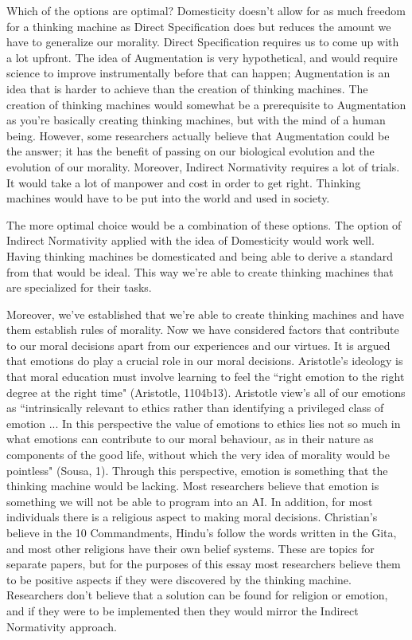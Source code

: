 \documentclass[11pt, oneside]{article}
\begin{document}
\par Which of the options are optimal? Domesticity doesn't allow for as much freedom for a thinking machine as Direct Specification does but reduces the amount we have to generalize our morality. Direct Specification requires us to come up with a lot upfront.
The idea of Augmentation is very hypothetical, and would require science to improve instrumentally before that can happen; Augmentation is an idea that is harder to achieve than the creation of thinking machines. The creation of thinking machines would somewhat be a prerequisite to Augmentation as you're basically creating thinking machines, but with the mind of a human being. However, some researchers actually believe that Augmentation could be the answer; it has the benefit of passing on our biological evolution and the evolution of our morality. Moreover, Indirect Normativity requires a lot of trials. It would take a lot of manpower and cost in order to get right. Thinking machines would have to be put into the world and used in society.
 
\par The more optimal choice would be a combination of these options. The option of Indirect Normativity applied with the idea of Domesticity would work well. Having thinking machines be domesticated and being able to derive a standard from that would be ideal. This way we're able to create thinking machines that are specialized for their tasks.
 
\par Moreover, we've established that we're able to create thinking machines and have them establish rules of morality. Now we have considered factors that contribute to our moral decisions apart from our experiences and our virtues. It is argued that emotions do play a crucial role in our moral decisions. Aristotle's ideology is that moral education must involve learning to feel the ``right emotion to the right degree at the right time" (Aristotle, 1104b13). Aristotle view's all of our emotions as ``intrinsically relevant to ethics rather than identifying a privileged class of emotion ... In this perspective the value of emotions to ethics lies not so much in what emotions can contribute to our moral behaviour, as in their nature as components of the good life, without which the very idea of morality would be pointless" (Sousa, 1). Through this perspective, emotion is something that the thinking machine would be lacking. Most researchers believe that emotion is something we will not be able to program into an AI. In addition, for most individuals there is a religious aspect to making moral decisions. Christian's believe in the 10 Commandments, Hindu's follow the words written in the Gita, and most other religions have their own belief systems. These are topics for separate papers, but for the purposes of this essay most researchers believe them to be positive aspects if they were discovered by the thinking machine. Researchers don't believe that a solution can be found for religion or emotion, and if they were to be implemented then they would mirror the Indirect Normativity approach.
 
\end{document}
